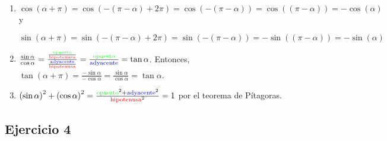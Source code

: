\begin{enumerate}
\item $\cos \left(\alpha + \pi\right) =
  \cos \left(-\left(\pi-\alpha\right) + 2\pi\right) = 
  \cos \left(-\left(\pi-\alpha\right)\right) =
  \cos \left(\left(\pi-\alpha\right)\right) = -\cos(\alpha)$ y 

$\sin \left(\alpha + \pi\right) =
  \sin \left(-\left(\pi-\alpha\right) + 2\pi\right) = 
  \sin \left(-\left(\pi-\alpha\right)\right) =
  -\sin \left(\left(\pi-\alpha\right)\right) = -\sin(\alpha)$
\item $\frac{\sin \alpha}{\cos \alpha} =
\frac{\frac{\color{green}{\text{opuesto}}}{\text{\color{red}{\text{hipotenusa}}}}}{\frac{\color{blue}{\text{adyacente}}}{\text{\color{red}{\text{hipotenusa}}}}} = 
\frac{\color{green}{\text{opuesto}}}{\color{blue}{\text{adyacente}}} =
{\tan \alpha}$. Entonces, 
$\tan \left(\alpha+\pi\right) = \frac{-\sin \alpha}{-\cos \alpha} =
\frac{\sin \alpha}{\cos \alpha} = {\tan \alpha}$.

\item $\left(\sin \alpha\right)^2 + \left(\cos \alpha\right)^2 = 
  \frac{{\color{green}{\text{opuesto}}}^2
    +{\color{blue}{\text{adyacente}}}^2
  }{\text{\color{red}{\text{hipotenusa}}}^2} = 1$ por el teorema de Pítagoras.
\end{enumerate}

\subsection{Ejercicio 4}

